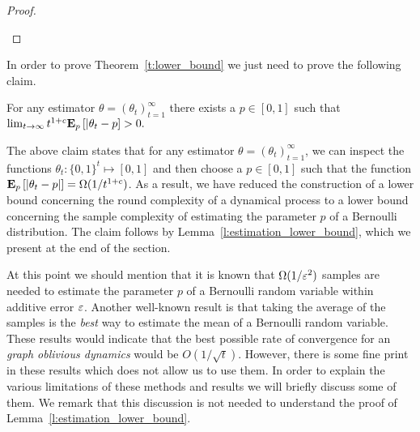 \begin{proof}
\begin{figure}
    \vspace{-12mm}
     \caption{}
    \label{fig:lb_instance}
    \vspace{-8mm}
  \end{figure}
\end{proof}
%
In order to prove Theorem~\ref{t:lower_bound} we
just need to prove the following claim.
\begin{claim}\label{cl:fixed_p}
  For any estimator $\theta = (\theta_t)_{t=1}^\infty$
  there exists a $p \in [0,1]$ such that
  \(
    \lim_{t \to \infty} t^{1+c} \bm{\mathrm{E}}_{p} \left[ |\theta_t - p \right] > 0.
  \)
\end{claim}
The above claim states that for any estimator $\theta=(\theta_t)_{t=1}^\infty$,
we can inspect the functions $\theta_t: \{0,1\}^t \mapsto [0,1]$ and then choose
a $p \in [0,1]$ such that the function $\bm{\mathrm{E}}_{p} \left[ |\theta_t-p| \right]= \Omega(1/t^{1+c})$. As
a result, we have reduced the construction of a lower bound concerning the round
complexity of a dynamical process to a lower bound concerning the sample complexity of
estimating the parameter $p$ of a Bernoulli distribution. The claim follows by
Lemma~\ref{l:estimation_lower_bound}, which we present at the end of the section.

At this point we should mention that it is known
that $\Omega(1/\varepsilon^2)$ samples are needed to estimate the parameter $p$
of a Bernoulli random variable within additive error $\varepsilon$.
Another well-known result is that taking the average of the samples
is the \emph{best} way to estimate the mean of a Bernoulli random variable.
These results would indicate that the best possible rate of convergence
for an \emph{graph oblivious dynamics} would be $O(1/\sqrt{t})$.
However, there is some fine print in these results which does not allow us
to use them. In order to explain the various limitations of
these methods and results we will briefly discuss some of them.
We remark that this discussion is not needed to understand the proof of
Lemma~\ref{l:estimation_lower_bound}.

